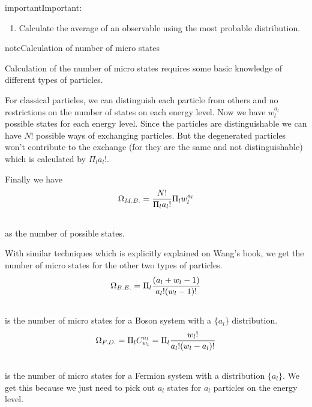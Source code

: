 \documentclass[letterpaper,10pt,english]{sphinxmanual}
\begin{document}
\begin{notice}{important}{Important:}
\begin{enumerate}
\item {} 
Calculate the average of an observable using the most probable distribution.

\end{enumerate}

\begin{notice}{note}{Calculation of number of micro states}

Calculation of the number of micro states requires some basic knowledge of different types of particles.

For classical particles, we can distinguish each particle from others and no restrictions on the number of states on each energy level. Now we have $w_l^{a_l}$ possible states for each energy level. Since the particles are distinguishable we can have $N!$ possible ways of exchanging particles. But the degenerated particles won't contribute to the exchange (for they are the same and not distinguishable) which is calculated by $\Pi_l a_l!$.

Finally we have
\begin{gather}
\begin{split}\Omega _{M.B.} = \frac{N!}{\Pi_l a_l !} \Pi_l w_l^{a_l}\end{split}\notag\\\begin{split}\end{split}\notag
\end{gather}
as the number of possible states.

With similar techniques which is explicitly explained on Wang's book, we get the number of micro states for the other two types of particles.
\begin{gather}
\begin{split}\Omega _{B.E.} = \Pi_l \frac{(a_l+w_l-1)}{a_l!(w_l -1)!}\end{split}\notag\\\begin{split}\end{split}\notag
\end{gather}
is the number of micro states for a Boson system with a $\{a_l\}$ distribution.
\begin{gather}
\begin{split}\Omega _ {F.D.} = \Pi _ {l} C_{w_l}^{a_l} = \Pi _ l \frac{w_l!}{a_l!(w_l - a_l)!}\end{split}\notag\\\begin{split}\end{split}\notag
\end{gather}
is the number of micro states for a Fermion system with a distribution $\{a_l\}$. We get this because we just need to pick out $a_l$ states for $a_l$ particles on the energy level.
\end{notice}
\end{notice}
\end{document}
